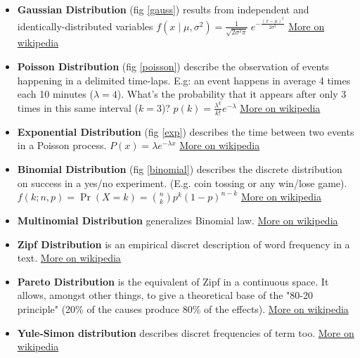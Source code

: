 \begin{itemize}
	\item \textbf{Gaussian Distribution} (fig \ref{gauss}) results from independent and identically-distributed variables 
	$f(x\;|\;\mu ,\sigma ^{2})={\frac {1}{\sqrt {2\sigma ^{2}\pi }}}\;e^{-{\frac {(x-\mu )^{2}}{2\sigma ^{2}}}}$
	\href{https://en.wikipedia.org/wiki/Gaussian_distribution}{More on wikipedia}
	
	\item \textbf{Poisson Distribution} (fig \ref{poisson}) describe the observation of events happening in a delimited time-laps. E.g: an event happens in average 4 times each 10 minutes ($\lambda = 4$). What's the probability that it appears after only 3 times in this same interval ($k = 3$)? $p(k) = \frac{\lambda ^k}{k!}e^{-\lambda}$ \href{https://en.wikipedia.org/wiki/Poisson_distribution}{More on wikipedia}

	\item \textbf{Exponential Distribution} (fig \ref{exp}) describes the time between two events in a Poisson process. $P(x) = \lambda e^{- \lambda x}$ \href{https://en.wikipedia.org/wiki/Exponential_distribution}{More on wikipedia}
	
	\item \textbf{Binomial Distribution} (fig \ref{binomial}) describes the discrete distribution on success in a yes/no experiment. (E.g. coin tossing or any win/lose game). $f(k;n,p)=\Pr(X=k)={\binom {n}{k}}p^{k}(1-p)^{n-k}$ \href{https://en.wikipedia.org/wiki/Binomial_distribution}{More on wikipedia}
	
	\item \textbf{Multinomial Distribution} generalizes Binomial law. \href{https://en.wikipedia.org/wiki/Multinomial_distribution}{More on wikipedia}
	
	\item \textbf{Zipf Distribution} is an empirical discret description of word frequency in a text. \href{https://en.wikipedia.org/wiki/Zipfs_law}{More on wikipedia}
	
	\item \textbf{Pareto Distribution} is the equivalent of Zipf in a continuous space. It allows, amongst other things, to give a theoretical base of the "80-20 principle" (20\% of the causes produce 80\% of the effects). \href{https://en.wikipedia.org/wiki/Pareto_distribution}{More on wikipedia}
	
	\item \textbf{Yule-Simon distribution} describes discret frequencies of term too. \href{https://en.wikipedia.org/wiki/Yule?Simon_distribution}{More on wikipedia}
\end{itemize}

